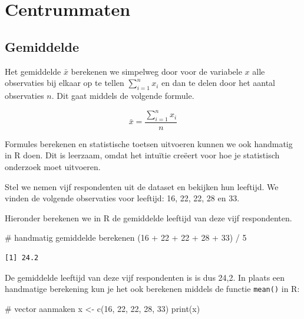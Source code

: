 \documentclass[
  letterpaper,
  DIV=11,
  numbers=noendperiod]{scrreprt}
\newenvironment{Shaded}{\begin{snugshade}}{\end{snugshade}}
\newcommand{\CommentTok}[1]{\textcolor[rgb]{0.37,0.37,0.37}{#1}}
\newcommand{\DecValTok}[1]{\textcolor[rgb]{0.68,0.00,0.00}{#1}}
\newcommand{\FunctionTok}[1]{\textcolor[rgb]{0.28,0.35,0.67}{#1}}
\newcommand{\NormalTok}[1]{\textcolor[rgb]{0.00,0.23,0.31}{#1}}
\newcommand{\OtherTok}[1]{\textcolor[rgb]{0.00,0.23,0.31}{#1}}
\newcommand{\SpecialCharTok}[1]{\textcolor[rgb]{0.37,0.37,0.37}{#1}}
\begin{document}
\section{Centrummaten}\label{centrummaten}

\subsection{Gemiddelde}\label{gemiddelde}

Het gemiddelde \(\bar{x}\) berekenen we simpelweg door voor de variabele
\(x\) alle observaties bij elkaar op te tellen \(\sum_{i=1}^n{x_i}\) en
dan te delen door het aantal observaties \(n\). Dit gaat middels de
volgende formule.

\[
\bar{x}=\frac{\sum_{i=1}^{n}{x_i}}{n}
\]

Formules berekenen en statistische toetsen uitvoeren kunnen we ook
handmatig in R doen. Dit is leerzaam, omdat het intuïtie creëert voor
hoe je statistisch onderzoek moet uitvoeren.

Stel we nemen vijf respondenten uit de dataset en bekijken hun leeftijd.
We vinden de volgende observaties voor leeftijd: 16, 22, 22, 28 en 33.

Hieronder berekenen we in R de gemiddelde leeftijd van deze vijf
respondenten.

\begin{Shaded}
\begin{Highlighting}[]
\CommentTok{\# handmatig gemiddelde berekenen}
\NormalTok{(}\DecValTok{16} \SpecialCharTok{+} \DecValTok{22} \SpecialCharTok{+} \DecValTok{22} \SpecialCharTok{+} \DecValTok{28} \SpecialCharTok{+} \DecValTok{33}\NormalTok{) }\SpecialCharTok{/} \DecValTok{5}
\end{Highlighting}
\end{Shaded}

\begin{verbatim}
[1] 24.2
\end{verbatim}

De gemiddelde leeftijd van deze vijf respondenten is is dus 24,2. In
plaats een handmatige berekening kun je het ook berekenen middels de
functie \texttt{mean()} in R:

\begin{Shaded}
\begin{Highlighting}[]
\CommentTok{\# vector aanmaken}
\NormalTok{x }\OtherTok{\textless{}{-}} \FunctionTok{c}\NormalTok{(}\DecValTok{16}\NormalTok{, }\DecValTok{22}\NormalTok{, }\DecValTok{22}\NormalTok{, }\DecValTok{28}\NormalTok{, }\DecValTok{33}\NormalTok{)}
\FunctionTok{print}\NormalTok{(x)}
\end{Highlighting}
\end{Shaded}
\end{document}
